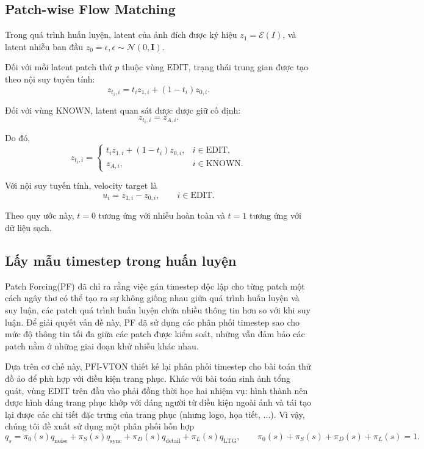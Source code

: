 \documentclass[11pt,a4paper]{article}
\newcommand{\Enc}{\mathcal{E}}
\begin{document}
\subsection{Patch-wise Flow Matching}

Trong quá trình huấn luyện, latent của ảnh đích được ký hiệu $z_1=\Enc(I)$, và latent nhiễu ban đầu $z_0=\epsilon, \epsilon\sim\mathcal N(0,\mathbf I)$.


Đối với mỗi latent patch thứ \(p\) thuộc vùng EDIT, trạng thái trung gian được tạo theo nội suy tuyến tính:
\begin{equation}
z_{t_i,i}=t_i z_{1,i}+(1-t_i)z_{0,i}.
\end{equation}

Đối với vùng KNOWN, latent quan sát được được giữ cố định:
\begin{equation}
z_{t_i,i}=z_{A,i}.
\end{equation}

Do đó,
\begin{equation}
z_{t_i,i}= \begin{cases} t_i z_{1,i}+(1-t_i)z_{0,i},& i\in\mathrm{EDIT},\\ z_{A,i},& i\in\mathrm{KNOWN}. \end{cases} \label{eq:flow_path}
\end{equation}

Với nội suy tuyến tính, velocity target là
\begin{equation}
u_i=z_{1,i}-z_{0,i},\qquad i\in\mathrm{EDIT}. \label{eq:velocity_target}
\end{equation}

Theo quy ước này, \(t=0\) tương ứng với nhiễu hoàn toàn và \(t=1\) tương ứng với dữ liệu sạch.

\subsection{Lấy mẫu timestep trong huấn luyện}

Patch Forcing(PF) \cite{pf} đã chỉ ra rằng việc gán timestep độc lập cho từng patch một cách ngây thơ có thể tạo ra sự không giống nhau giữa quá trình huấn luyện và suy luận, các patch quá trình huấn luyện chứa nhiều thông tin hơn so với khi suy luận. Để giải quyết vấn đề này, PF đã sử dụng các phân phối timestep sao cho mức độ thông tin tối đa giữa các patch được kiểm soát, những vẫn đảm bảo các patch nằm ở những giai đoạn khử nhiễu khác nhau.

Dựa trên cơ chế này, PFI-VTON thiết kế lại phân phối timestep cho bài toán thử đồ ảo để phù hợp với điều kiện trang phục. Khác với bài toán sinh ảnh tổng quát, vùng EDIT trên đầu vào phải đồng thời học hai nhiệm vụ: hình thành nên được hình dáng trang phục khớp với dáng người từ điều kiện ngoài ảnh và tái tạo lại được các chi tiết đặc trưng của trang phục (nhưng logo, họa tiết, ...). Vì vậy, chúng tôi đề xuất sử dụng một phân phối hỗn hợp
\begin{equation}
q_s=\pi_0(s)q_{\mathrm{noise}}+\pi_S(s)q_{\mathrm{sync}}+\pi_D(s)q_{\mathrm{detail}}+\pi_L(s)q_{\mathrm{LTG}},\qquad \pi_0(s)+\pi_S(s)+\pi_D(s)+\pi_L(s)=1.
\label{eq:time_mixture}
\end{equation}
\end{document}
